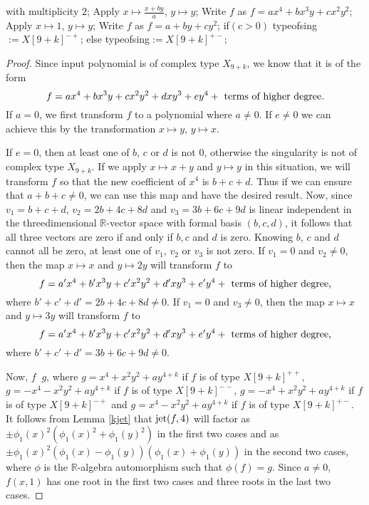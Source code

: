 \documentclass{amsproc}
\DeclareMathOperator{\requiv}{\overset{r}{\sim}}
\begin{document}
\begin{itemize}
\phantom{}\quad with multiplicity $2$;\newline
\phantom{}\quad Apply $x\mapsto\frac{x+by}{a}$, $y\mapsto y$;\newline
\phantom{}\quad Write $f$ as $f=ax^4+bx^3y+cx^2y^2$;\newline
\phantom{}\quad Apply $x\mapsto 1$, $y\mapsto y$;\newline
\phantom{}\quad Write $f$ as $f=a+by+cy^2$;\newline
\phantom{}\quad if$(c>0)$\newline
\phantom{}\quad\quad typeofsing$:= X[9+k]^{-+}$;\newline
\phantom{}\quad else\newline
\phantom{}\quad\quad typeofsing$:=X[9+k]^{+-}$;
\end{itemize}
\begin{proof}
Since input polynomial is of complex type $X_{9+k}$, we know that it is of the form \[f=ax^4+bx^3y+cx^2y^2+dxy^3+ey^4+\textnormal{ terms of higher degree.}\]
If $a= 0$, we first transform $f$ to a polynomial where $a\neq 0$. If $e\neq 0$ we can achieve this by the transformation $x\mapsto y$, $y\mapsto x$. 

If $e=0$, then at least one of $b$, $c$ or $d$ is not $0$, otherwise the
singularity  is not of complex type $X_{9+k}$.  If we apply $x\mapsto x+y$ and
$y\mapsto y$ in this situation, we will transform $f$ so that the new
coefficient of $x^4$ is $b+c+d$. Thus if we can ensure that $a+b+c\neq 0$, we
can use this map and have the desired result. Now, since $v_1=b+c+d$,
$v_2=2b+4c+8d$ and $v_3=3b+6c+9d$ is linear independent in the threedimensional
$\mathbb R$-vector space with formal basis $(b, c, d)$, it follows that all
three vectors are zero if and only if $b,c$ and $d$ is zero. Knowing $b$, $c$
and $d$ cannot all be zero, at least one of $v_1$, $v_2$ or $v_3$ is not zero. If $v_1=0$ and $v_2\neq 0$, then the map $x\mapsto x$ and $y\mapsto 2y$ will transform $f$ to \[f=a'x^4+b'x^3y+c'x^2y^2+d'xy^3+e'y^4+\textnormal{ terms of higher degree,}\] where $b'+c'+d'=2b+4c+8d\neq 0$. If $v_1=0$ and $v_3\neq 0$, then the map $x\mapsto x$ and $y\mapsto 3y$ will transform $f$ to  \[f=a'x^4+b'x^3y+c'x^2y^2+d'xy^3+e'y^4+\textnormal{ terms of higher degree,}\]where $b'+c'+d'=3b+6c+9d\neq0$.

Now, $f\requiv g$, where $g=x^4+x^2y^2+ay^{4+k}$ if $f$ is of type
$X[9+k]^{++}$, $g=-x^4-x^2y^2+ay^{4+k}$ if $f$ is of type $X[9+k]^{--}$,
$g=-x^4+x^2y^2+ay^{4+k}$ if $f$ is of type $X[9+k]^{-+}$ and
$g=x^4-x^2y^2+ay^{4+k}$ if $f$ is of type $X[9+k]^{+-}$.  It follows from Lemma
\ref{kjet} that $\textnormal{jet}(f,4)$ will factor as
$\pm\phi_1(x)^2(\phi_1(x)^2+\phi_1(y)^2)$ in the first two cases and as
$\pm\phi_1(x)^2(\phi_1(x)-\phi_1(y))(\phi_1(x)+\phi_1(y))$ in the second two
cases, where $\phi$ is the $\mathbb R$-algebra automorphism such that
$\phi(f)=g$. Since $a\neq 0$,  $f(x,1)$ has one root in the first two cases and
three roots in the last two cases. 


\end{proof}
\end{document}
